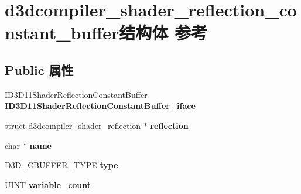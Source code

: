 \hypertarget{structd3dcompiler__shader__reflection__constant__buffer}{}\section{d3dcompiler\+\_\+shader\+\_\+reflection\+\_\+constant\+\_\+buffer结构体 参考}
\label{structd3dcompiler__shader__reflection__constant__buffer}
\subsection*{Public 属性}
\begin{DoxyCompactItemize}
\item 
\mbox{\label{structd3dcompiler__shader__reflection__constant__buffer_a0ec4df5b15490e7e7b654b898f0fb91d}} 
I\+D3\+D11\+Shader\+Reflection\+Constant\+Buffer {\bfseries I\+D3\+D11\+Shader\+Reflection\+Constant\+Buffer\+\_\+iface}
\item 
\mbox{\label{structd3dcompiler__shader__reflection__constant__buffer_a2df3218fa6c030627eff775ec7073534}} 
\hyperlink{interfacestruct}{struct} \hyperlink{structd3dcompiler__shader__reflection}{d3dcompiler\+\_\+shader\+\_\+reflection} $\ast$ {\bfseries reflection}
\item 
\mbox{\label{structd3dcompiler__shader__reflection__constant__buffer_ae42415c8bd37f540867a96dcefbedfe5}} 
char $\ast$ {\bfseries name}
\item 
\mbox{\label{structd3dcompiler__shader__reflection__constant__buffer_ab76e4bb55e2dffa74dfd65f635ffb258}} 
D3\+D\+\_\+\+C\+B\+U\+F\+F\+E\+R\+\_\+\+T\+Y\+PE {\bfseries type}
\item 
\mbox{\label{structd3dcompiler__shader__reflection__constant__buffer_a7ea6db9c260da547f0cf17856eb51e7d}} 
U\+I\+NT {\bfseries variable\+\_\+count}
\item 
\mbox{\label{structd3dcompiler__shader__reflection__constant__buffer_aaf67257da36735ec24cf905dd6392e37}} 

\end{DoxyCompactItemize}
